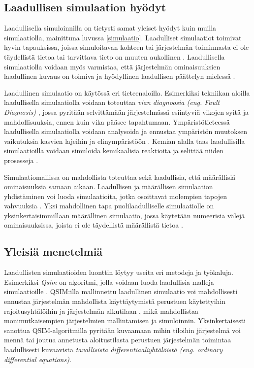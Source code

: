 \documentclass[utf8]{gradu3}
\begin{document}
\subsection{Laadullisen simulaation hyödyt}
Laadullisella simuloinnilla on tietysti samat yleiset hyödyt 
kuin muilla simulaatiolla, mainittuna luvussa \ref{simulaatio}. 
Laadulliset simulaatiot toimivat hyvin tapauksissa, 
joissa simuloitavan kohteen tai järjestelmän toiminnasta 
ei ole täydellistä tietoa tai tarvittava tieto on 
muuten aukollinen \parencite{kuipers1986qualitative}. 
Laadullisella simulaatiolla voidaan myös varmistaa, että järjestelmän
ominaisuuksien laadullinen kuvaus on toimiva ja hyödyllinen 
laadullisen päättelyn mielessä \parencite{kuipers1986qualitative}.

Laadullinen simulaatio on käytössä eri tieteenaloilla.
Esimerkiksi tekniikan aloilla laadullisella simulaatiolla voidaan toteuttaa
\textit{vian diagnoosia (eng. Fault Diagnosis)} \parencite{QualitativeReasoning1997},
jossa pyritään selvittämään järjestelmässä esiintyviä vikojen syitä ja mahdollisuuksia, 
ennen kuin vika pääsee tapahtumaan.
Ympäristötieteessä laadullisella simulaatiolla voidaan analysoida ja ennustaa
ympäristön muutoksen vaikutuksia kasvien lajeihin ja elinympäristöön \parencite{qualiAnalysisEnviron2010}.
Kemian alalla taas laadullisilla simulaatioilla voidaan simuloida kemikaalisia 
reaktioita ja selittää niiden prosesseja \parencite{chemistryQualitativeSim2002}.

Simulaatiomallissa on mahdollista toteuttaa sekä laadullisia, 
että määrällisiä ominaisuuksia samaan aikaan. 
Laadullisen ja määrällisen simulaation yhdistäminen voi luoda simulaatioita, 
jotka osoittavat molempien tapojen vahvuuksia 
\parencite{semiHybrid1997qualitative}. 
Yksi mahdollinen tapa puolilaadulliselle simulaatiolle on yksinkertaisimmillaan
määrällinen simulaatio, jossa käytetään numeerisia välejä ominaisuuksissa, 
joista ei ole täydellistä määrällistä tietoa \parencite{semiHybrid1997qualitative}.

\subsection{Yleisiä menetelmiä}
Laadullisten simulaatioiden luonttin löytyy useita eri metodeja ja työkaluja.
Esimerkiksi \textit{Qsim} on algoritmi, jolla voidaan luoda laadullisia malleja simulaatioille
\parencite{kuipers1986qualitative}. 
QSIM:illa mallinnettu laadullinen simulaatio voi mahdollisesti ennustaa 
järjestelmän mahdollista käyttäytymistä perustuen käytettyihin rajoitusyhtälöihin 
ja järjestelmän alkutilaan \parencite{kuipers1986qualitative}, mikä mahdollistaa
monimutkaisempien järjestelmien mallintamisen ja simuloinnin.
Yksinkertaisesti sanottua QSIM-algoritmilla pyritään kuvaamaan mihin tiloihin
järjestelmä voi mennä tai joutua annetusta aloitustilasta 
perustuen järjestelmän toimintaa laadullisesti kuvaavista 
\textit{ tavallisista differentiaaliyhtälöistä 
(eng. ordinary differential equations)}.
\end{document}
